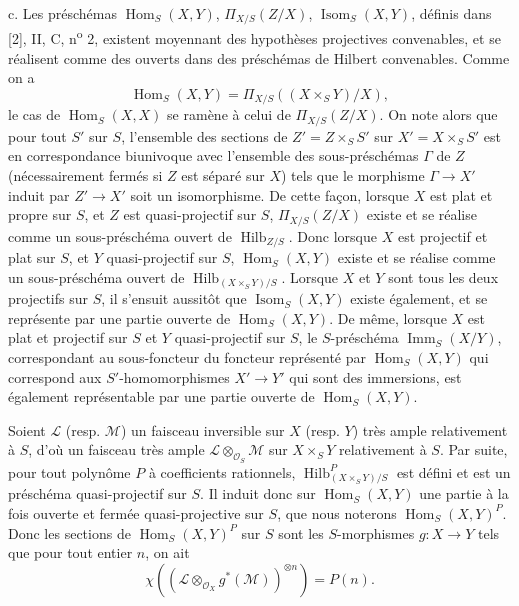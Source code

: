 \medskip
\noindent c. Les préschémas $\operatorname{Hom}_S(X,Y)$,
$\Pi_{X/S}(Z/X)$, $\operatorname{Isom}_S(X,Y)$, définis dans [2], II, C,
n\textsuperscript{o} 2, existent moyennant des hypothèses projectives
convenables, et se réalisent comme des ouverts dans des préschémas de Hilbert
convenables. Comme on a
\[
\operatorname{Hom}_S(X,Y)=\Pi_{X/S}((X\times_SY)/X),
\]
le cas de $\operatorname{Hom}_S(X,X)$ se ramène à celui de $\Pi_{X/S}(Z/X)$.
On note alors que pour tout $S'$ sur $S$, l'ensemble des sections de
$Z'=Z\times_SS'$ sur $X'=X\times_SS'$ est en correspondance biunivoque avec
l'ensemble des sous-préschémas $\Gamma$ de $Z$ (nécessairement fermés si $Z$
est séparé sur $X$) tels que le morphisme $\Gamma\longrightarrow X'$ induit par
$Z'\longrightarrow X'$ soit un isomorphisme. De cette façon,
lorsque $X$ est plat et propre sur $S$, et $Z$ est quasi-projectif sur $S$,
$\Pi_{X/S}(Z/X)$ existe et se réalise comme un sous-préschéma ouvert de
$\operatorname{Hilb}_{Z/S}$. Donc lorsque $X$ est projectif et plat sur $S$, et
$Y$ quasi-projectif sur $S$, $\operatorname{Hom}_S(X,Y)$ existe et se réalise
comme un sous-préschéma ouvert de
$\operatorname{Hilb}_{(X\times_SY)/S}$. Lorsque $X$ et $Y$ sont tous les deux
projectifs sur $S$, il s'ensuit aussitôt que $\operatorname{Isom}_S(X,Y)$
existe également, et se représente par une partie ouverte de
$\operatorname{Hom}_S(X,Y)$. De même, lorsque $X$ est plat et projectif sur $S$
et $Y$ quasi-projectif sur $S$, le $S$-préschéma
$\operatorname{Imm}_S(X/Y)$, correspondant au sous-foncteur du foncteur
représenté par $\operatorname{Hom}_S(X,Y)$ qui correspond aux
$S'$-homomorphismes $X'\longrightarrow Y'$ qui sont des immersions, est
également représentable par une partie ouverte de
$\operatorname{Hom}_S(X,Y)$.

Soient $\mathcal L$ (resp. $\mathcal M$) un faisceau inversible sur $X$ (resp.
$Y$) très ample relativement à $S$, d'où un faisceau très ample
$\mathcal L\otimes_{\mathcal O_S}\mathcal M$ sur $X\times_SY$ relativement à
$S$. Par suite, pour tout polynôme $P$ à coefficients rationnels,
$\operatorname{Hilb}^P_{(X\times_SY)/S}$ est défini et est un préschéma
quasi-projectif sur $S$. Il induit donc sur $\operatorname{Hom}_S(X,Y)$ une
partie à la fois ouverte et fermée quasi-projective sur $S$, que nous noterons
$\operatorname{Hom}_S(X,Y)^P$. Donc les sections de
$\operatorname{Hom}_S(X,Y)^P$ sur $S$ sont les $S$-morphismes
$g:X\longrightarrow Y$ tels que pour tout entier $n$, on ait
\[
\chi\!\left(\left(\mathcal L\otimes_{\mathcal O_X}g^*(\mathcal M)\right)^{
\otimes n}\right)=P(n).
\]

